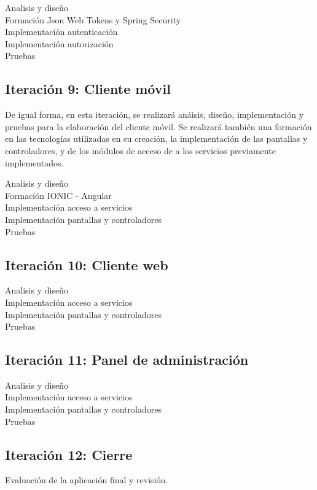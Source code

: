 Analisis y diseño\\
Formación Json Web Tokens y Spring Security\\
Implementación autenticación\\
Implementación autorización\\
Pruebas

\subsection{Iteración 9: Cliente móvil}
De igual forma, en esta iteración, se realizará anáisis, diseño, implementación y pruebas para la elaboración del cliente móvil. Se realizará también una formación en las tecnologías utilizadas en su creación, la implementación de las pantallas y controladores, y de los módulos de acceso de a los servicios previamente implementados.

Analisis y diseño\\
Formación IONIC - Angular\\
Implementación acceso a servicios\\
Implementación pantallas y controladores\\
Pruebas

\subsection{Iteración 10: Cliente web}
Analisis y diseño\\
Implementación acceso a servicios\\
Implementación pantallas y controladores\\
Pruebas

\subsection{Iteración 11: Panel de administración}
Analisis y diseño\\
Implementación acceso a servicios\\
Implementación pantallas y controladores\\
Pruebas

\subsection{Iteración 12: Cierre}
Evaluación de la aplicación final y revisión.





